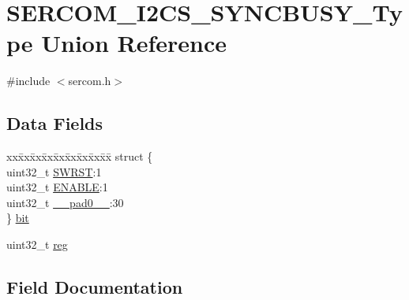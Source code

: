 \hypertarget{union_s_e_r_c_o_m___i2_c_s___s_y_n_c_b_u_s_y___type}{}\section{S\+E\+R\+C\+O\+M\+\_\+\+I2\+C\+S\+\_\+\+S\+Y\+N\+C\+B\+U\+S\+Y\+\_\+\+Type Union Reference}
\label{union_s_e_r_c_o_m___i2_c_s___s_y_n_c_b_u_s_y___type}


{\ttfamily \#include $<$sercom.\+h$>$}

\subsection*{Data Fields}
\begin{DoxyCompactItemize}
\item 
\begin{tabbing}
xx\=xx\=xx\=xx\=xx\=xx\=xx\=xx\=xx\=\kill
struct \{\\
\>uint32\_t \mbox{\hyperlink{union_s_e_r_c_o_m___i2_c_s___s_y_n_c_b_u_s_y___type_a34cd956a8da179cbd5fc9060306d420e}{SWRST}}:1\\
\>uint32\_t \mbox{\hyperlink{union_s_e_r_c_o_m___i2_c_s___s_y_n_c_b_u_s_y___type_a66f979832c85e0692bd9422b05aff1f7}{ENABLE}}:1\\
\>uint32\_t \mbox{\hyperlink{union_s_e_r_c_o_m___i2_c_s___s_y_n_c_b_u_s_y___type_a3e57c2ef1c3ffb36722f000cc1156824}{\_\_pad0\_\_}}:30\\
\} \mbox{\hyperlink{union_s_e_r_c_o_m___i2_c_s___s_y_n_c_b_u_s_y___type_a4cfe20eb186141b11105df9d8bee9a64}{bit}}\\

\end{tabbing}\item 
uint32\+\_\+t \mbox{\hyperlink{union_s_e_r_c_o_m___i2_c_s___s_y_n_c_b_u_s_y___type_a6b91636401516a477989a336376d7b40}{reg}}
\end{DoxyCompactItemize}


\subsection{Field Documentation}
\mbox{\label{union_s_e_r_c_o_m___i2_c_s___s_y_n_c_b_u_s_y___type_a3e57c2ef1c3ffb36722f000cc1156824}} 
